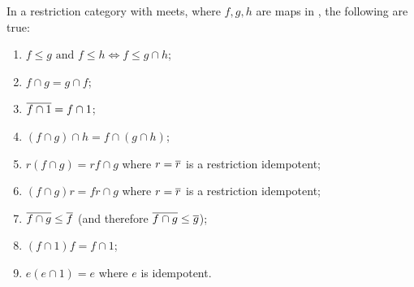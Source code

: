 \begin{lemma}
  \label{lem:properties_of_meets_in_restriction_categories}
  In a restriction category \X with meets, where $f, g, h$ are maps in
  \X, the following are true:
  \begin{enumerate}[{(}i{)}]
    \item $f\le g \text{ and } f \le h \iff f \le g\cap h$;
        \label{lemsub:properties_of_meets_one}
    \item $f\cap g = g \cap f$;\label{lemsub:properties_of_meets_two}
    \item $\overline{f\cap 1} = f \cap 1$;\label{lemsub:properties_of_meets_three}
    \item $(f \cap g) \cap h = f \cap (g \cap h)$;
    \item $r(f\cap g) = r f \cap g$ where $r=\overline{r}$ is a restriction idempotent;
    \item $(f\cap g)r = f r \cap g$ where $r=\overline{r}$ is a restriction idempotent;
    \item $\overline{f\cap g} \le \overline{f}$ (and therefore $\overline{f\cap g} \le \overline{g}$);
    \item $ (f \cap 1) f = f \cap 1$;
    \item $ e(e \cap 1) = e$ where $e$ is idempotent.
  \end{enumerate}
\end{lemma}
